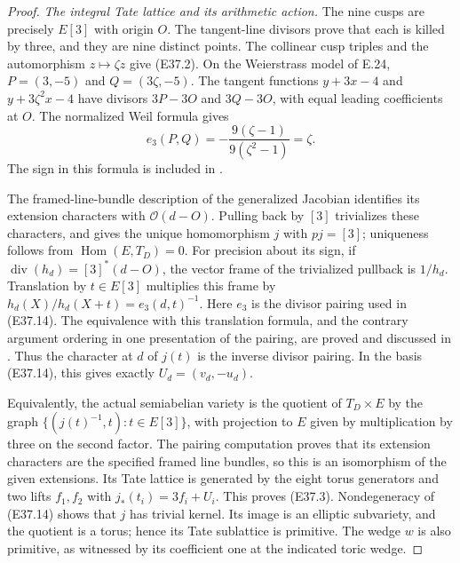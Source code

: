 \begin{proof}
\emph{The integral Tate lattice and its arithmetic action.}
The nine cusps are precisely $E[3]$ with origin $O$.
The tangent-line divisors prove that each is killed by
three, and they are nine distinct points. The collinear
cusp triples and the automorphism $z\mapsto\zeta z$
give (E37.2). On the Weierstrass model of E.24,
$P=(3,-5)$ and $Q=(3\zeta,-5)$.
The tangent functions $y+3x-4$ and $y+3\zeta^2x-4$
have divisors $3P-3O$ and $3Q-3O$, with equal leading
coefficients at $O$. The normalized Weil formula gives
\[
 e_3(P,Q)=-\frac{9(\zeta-1)}{9(\zeta^2-1)}=\zeta .
 \tag{E37.14}
\]
The sign in this formula is included in
\cite[Corollary 24.27]{E_SutherlandWeil}.

The framed-line-bundle description of the generalized
Jacobian identifies its extension characters with
$\mathcal O(d-O)$. Pulling back by $[3]$ trivializes
these characters, and gives the unique homomorphism $j$
with $pj=[3]$; uniqueness follows from
$\operatorname{Hom}(E,T_D)=0$.
For precision about its sign, if
$\operatorname{div}(h_d)=[3]^*(d-O)$, the vector frame
of the trivialized pullback is $1/h_d$. Translation by
$t\in E[3]$ multiplies this frame by
$h_d(X)/h_d(X+t)=e_3(d,t)^{-1}$.
Here $e_3$ is the divisor pairing used in (E37.14).
The equivalence with this translation formula, and
the contrary argument ordering in one presentation
of the pairing, are proved and discussed in
\cite[\S3, Remark 9]{E_EngePairings}.
Thus the character at $d$ of $j(t)$ is the inverse
divisor pairing. In the basis (E37.14), this gives
exactly $U_d=(v_d,-u_d)$.

Equivalently, the actual semiabelian variety is the
quotient of $T_D\times E$ by the graph
$\{(j(t)^{-1},t):t\in E[3]\}$, with projection to $E$
given by multiplication by three on the second factor.
The pairing computation proves that its extension
characters are the specified framed line bundles, so
this is an isomorphism of the given extensions.
Its Tate lattice is generated by the eight torus
generators and two lifts $f_1,f_2$ with
$j_*(t_i)=3f_i+U_i$. This proves (E37.3).
Nondegeneracy of (E37.14) shows that $j$ has trivial
kernel. Its image is an elliptic subvariety, and the
quotient is a torus; hence its Tate sublattice is
primitive. The wedge $w$ is also primitive, as witnessed
by its coefficient one at the indicated toric wedge.


\end{proof}
